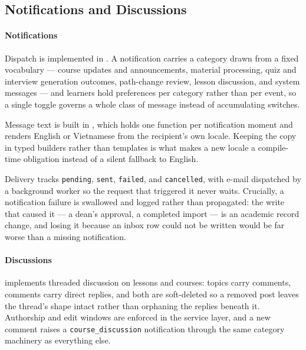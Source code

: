 \subsection{Notifications and Discussions}
\label{sec:impl_notifications}

\paragraph{Notifications}
Dispatch is implemented in . A notification carries a category drawn from a fixed vocabulary --- course updates and announcements, material processing, quiz and interview generation outcomes, path-change review, lesson discussion, and system messages --- and learners hold preferences per category rather than per event, so a single toggle governs a whole class of message instead of accumulating switches.

Message text is built in , which holds one function per notification moment and renders English or Vietnamese from the recipient's own locale. Keeping the copy in typed builders rather than templates is what makes a new locale a compile-time obligation instead of a silent fallback to English.

Delivery tracks \texttt{pending}, \texttt{sent}, \texttt{failed}, and \texttt{cancelled}, with e-mail dispatched by a background worker so the request that triggered it never waits. Crucially, a notification failure is swallowed and logged rather than propagated: the write that caused it --- a dean's approval, a completed import --- is an academic record change, and losing it because an inbox row could not be written would be far worse than a missing notification.

\paragraph{Discussions}
 implements threaded discussion on lessons and courses: topics carry comments, comments carry direct replies, and both are soft-deleted so a removed post leaves the thread's shape intact rather than orphaning the replies beneath it. Authorship and edit windows are enforced in the service layer, and a new comment raises a \texttt{course\_discussion} notification through the same category machinery as everything else.

